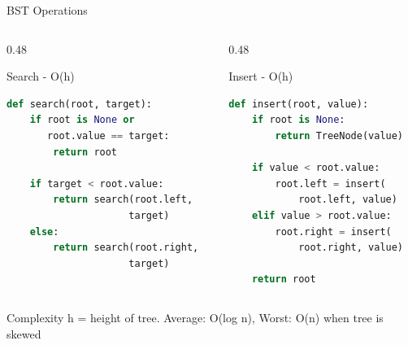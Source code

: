 \documentclass[aspectratio=169,xcolor=dvipsnames]{beamer}
\begin{document}
\begin{frame}[fragile]{BST Operations}
  \begin{columns}
    \begin{column}{0.48\textwidth}
      \begin{block}{Search - O(h)}
        \begin{lstlisting}[language=Python,basicstyle=\tiny\ttfamily]
def search(root, target):
    if root is None or
       root.value == target:
        return root

    if target < root.value:
        return search(root.left,
                     target)
    else:
        return search(root.right,
                     target)
        \end{lstlisting}
      \end{block}
    \end{column}
    \begin{column}{0.48\textwidth}
      \begin{block}{Insert - O(h)}
        \begin{lstlisting}[language=Python,basicstyle=\tiny\ttfamily]
def insert(root, value):
    if root is None:
        return TreeNode(value)

    if value < root.value:
        root.left = insert(
            root.left, value)
    elif value > root.value:
        root.right = insert(
            root.right, value)

    return root
        \end{lstlisting}
      \end{block}
    \end{column}
  \end{columns}

  \vspace{0.3cm}

  \begin{alertblock}{Complexity}
    h = height of tree. Average: O(log n), Worst: O(n) when tree is skewed
  \end{alertblock}
\end{frame}
\end{document}
